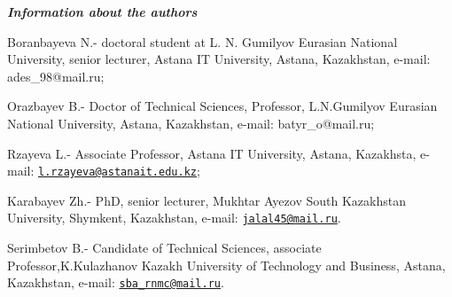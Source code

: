 \emph{{\bfseries Information about the authors}}

Boranbayeva N.- doctoral student at L. N. Gumilyov Eurasian National
University, senior lecturer, Astana IT University, Astana, Kazakhstan,
e-mail: ades\_98@mail.ru;

Orazbayev B.- Doctor of Technical Sciences, Professor, L.N.Gumilyov
Eurasian National University, Astana, Kazakhstan, e-mail:
batyr\_o@mail.ru;

Rzayeva L.- Associate Professor, Astana IT University, Astana,
Kazakhsta, e-mail:
\href{mailto:l.rzayeva@astanait.edu.kz}{\nolinkurl{l.rzayeva@astanait.edu.kz}};

Karabayev Zh.- PhD, senior lecturer, Mukhtar Ayezov South Kazakhstan
University, Shymkent, Kazakhstan, e-mail:
\href{mailto:jalal45@mail.ru}{\nolinkurl{jalal45@mail.ru}}.

Serimbetov B.- Candidate of Technical Sciences, associate
Professor,K.Kulazhanov Kazakh University of Technology and Business,
Astana, Kazakhstan, e-mail:
\href{mailto:sba_rnmc@mail.ru}{\nolinkurl{sba\_rnmc@mail.ru}}.
